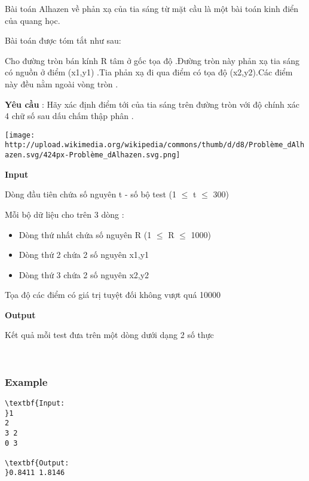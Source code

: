 

Bài toán Alhazen về phản xạ của tia sáng từ mặt cầu là một bài toán kinh điển của quang học.


Bài toán được tóm tắt như sau:


Cho đường tròn bán kính R tâm ở gốc tọa độ .Đường tròn này phản xạ tia sáng có nguồn ở điểm (x1,y1) .Tia phản xạ đi qua điểm có tọa độ (x2,y2).Các điểm này đều nằm ngoài vòng tròn .


\textbf{Yêu cầu } : Hãy xác định điểm tới của tia sáng trên đường tròn với độ chính xác 4 chữ số sau dấu chấm thập phân .



\texttt{[image: http://upload.wikimedia.org/wikipedia/commons/thumb/d/d8/Problème\_dAlhazen.svg/424px-Problème\_dAlhazen.svg.png]}\textbf{}

\textbf{Input }

Dòng đầu tiên chứa số nguyên t - số bộ test (1 $\le$ t $\le$ 300)


Mỗi bộ dữ liệu cho trên 3 dòng :
\begin{itemize}
	\item Dòng thứ nhất chứa số nguyên R (1 $\le$ R $\le$ 1000)
	\item Dòng thứ 2 chứa 2 số nguyên x1,y1
	\item Dòng thứ 3 chứa 2 số nguyên x2,y2
\end{itemize}

Tọa độ các điểm có giá trị tuyệt đối không vượt quá 10000





\textbf{\textbf{Output }}

Kết quả mỗi test đưa trên một dòng dưới dạng 2 số thực








 

\subsubsection{Example}
\begin{verbatim}
\textbf{Input:
}1
2
3 2
0 3

\textbf{Output:
}0.8411 1.8146


\end{verbatim}
